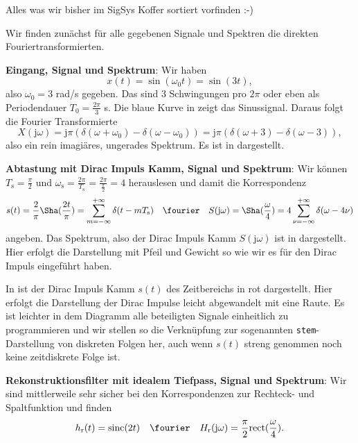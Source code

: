 \begin{Werkzeug}
Alles was wir bisher im SigSys Koffer sortiert vorfinden :-)
\end{Werkzeug}
\begin{Ansatz}
Wir finden zunächst für alle gegebenen Signale und Spektren die direkten
Fouriertransformierten.

\textbf{Eingang, Signal und Spektrum}:
Wir haben
\begin{equation}
x(t) = \sin(\omega_0 t) = \sin(3 t),
\end{equation}
also  $\omega_0=3$ rad/s gegeben. Das sind 3 Schwingungen pro $2\pi$ oder eben
als Periodendauer $T_0 = \frac{2\pi}{3}$ s.
Die blaue Kurve in  zeigt das Sinussignal.
Daraus folgt die Fourier Transformierte
\begin{equation}
X(\mathrm{j} \omega) =
\mathrm{j} \pi \left( \delta(\omega+\omega_0) - \delta(\omega-\omega_0) \right) =
\mathrm{j} \pi \left( \delta(\omega+3) - \delta(\omega-3) \right),
\end{equation}
also ein rein imagiäres, ungerades Spektrum. Es ist in 
dargestellt.

\textbf{Abtastung mit Dirac Impuls Kamm, Signal und Spektrum}:
Wir können $T_\mathrm{s} = \frac{\pi}{2}$ und
$\omega_\mathrm{s} = \frac{2 \pi}{T_\mathrm{s}} = \frac{2 \pi}{\frac{\pi}{2}} = 4$
herauslesen und damit die Korrespondenz
\begin{equation}
s(t) = \frac{2}{\pi} {\Sha}(\frac{2 t}{\pi}) =
\sum_{m=-\infty}^{+\infty} \delta(t-m T_\mathrm{s})
\quad\fourier\quad
S(\mathrm{j}\omega) = {\Sha}(\frac{\omega}{4}) =
4 \sum_{\nu=-\infty}^{+\infty} \delta(\omega-4 \nu)
\end{equation}
angeben. Das Spektrum, also der Dirac Impuls Kamm $S(\mathrm{j}\omega)$
ist in 
dargestellt. Hier erfolgt die Darstellung mit Pfeil und Gewicht so wie wir es
für den Dirac Impuls eingeführt haben.

In  ist der Dirac Impuls Kamm $s(t)$ des Zeitbereichs
in rot dargestellt. Hier erfolgt die Darstellung der Dirac Impulse leicht abgewandelt
mit eine Raute. Es ist leichter in dem Diagramm alle beteiligten Signale einheitlich
zu programmieren und wir stellen so die Verknüpfung zur sogenannten
\texttt{stem}-Darstellung von diskreten Folgen her, auch wenn $s(t)$ streng genommen
noch keine zeitdiskrete Folge ist.

\textbf{Rekonstruktionsfilter mit idealem Tiefpass, Signal und Spektrum}:
Wir sind mittlerweile sehr sicher bei den Korrespondenzen zur Rechteck- und
Spaltfunktion und finden
\begin{equation}
h_\mathrm{r}(t) = \mathrm{sinc}(2 t) \quad\fourier\quad
H_\mathrm{r}(\mathrm{j}\omega) = \frac{\pi}{2}\mathrm{rect}(\frac{\omega}{4}).
\end{equation}


\end{Ansatz}
